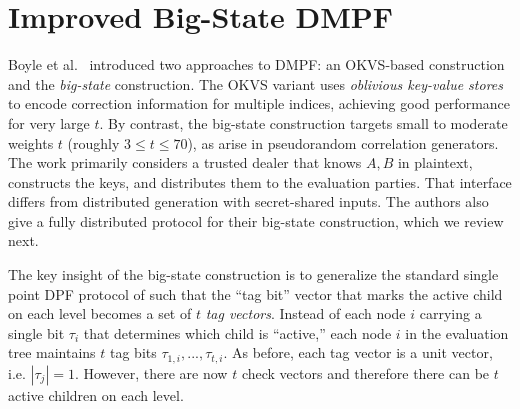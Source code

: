 
\section{Improved Big-State DMPF}\label{sec:bigState}

Boyle et al.~\cite{dmpf} introduced two approaches to DMPF: an OKVS-based construction and the \emph{big-state} construction.
The OKVS variant uses \emph{oblivious key-value stores} to encode correction information for multiple indices, achieving good performance for very large $t$. 
By contrast, the big-state construction targets small to moderate weights
$t$ (roughly $3 \leq t \leq 70$), as arise in pseudorandom correlation
generators. The work primarily considers a trusted dealer that knows
$A,B$ in plaintext, constructs the keys, and distributes them to the
evaluation parties. That interface differs from distributed generation
with secret-shared inputs. The authors also give a fully distributed
protocol for their big-state construction, which we review next.

The key insight of the big-state construction is to generalize the standard single point DPF protocol of  such that the ``tag bit'' vector that marks the active child on each level becomes a set of $t$ \emph{tag vectors}. Instead of each node $i$ carrying a single bit $\tau_i$ that determines which child is ``active,'' each node $i$ in the evaluation tree maintains  $t$ tag bits $\tau_{1,i},...,\tau_{t,i}$. As before, each tag vector is a unit vector, i.e. $|\tau_j|=1$. However, there are now $t$ check vectors and therefore there can be $t$ active children on each level.

